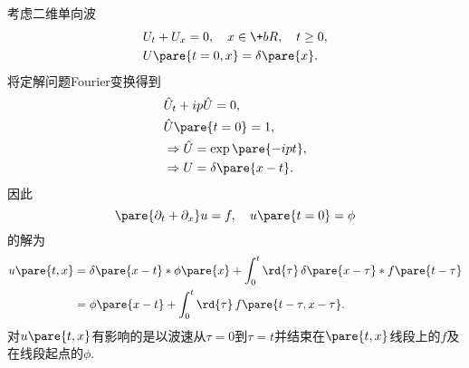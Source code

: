 \documentclass[hidelinks]{ctexart}
\begin{document}
\begin{sample}
    \begin{ex}
        考虑二维单向波
        \begin{align*}
            & U_t + U_x = 0,\quad x\in \+bR,\quad t\ge 0, \\
            & U\pare{t=0,x} = \delta\pare{x}.
        \end{align*}
        将定解问题Fourier变换得到
        \begin{align*}
            & \hat U_t + ip\hat U = 0, \\
            & \hat U\pare{t=0} = 1, \\
            & \Rightarrow \hat U = \exp\pare{-ipt}, \\
            & \Rightarrow U = \delta\pare{x-t}.
        \end{align*}
        因此
        \[ \pare{\partial_t + \partial_x}u = f,\quad u\pare{t=0} = \phi \]
        的解为
        \begin{align*}
            u\pare{t,x} &= \delta\pare{x-t}*\phi\pare{x} + \int_0^t \rd{\tau}\,\delta\pare{x-\tau} * f\pare{t-\tau} \\
            &= \phi\pare{x-t} + \int_0^t \rd{\tau}\, f\pare{t-\tau,x-\tau}.
        \end{align*}
        对$u\pare{t,x}$有影响的是以波速从$\tau = 0$到$\tau = t$并结束在$\pare{t,x}$线段上的$f$及在线段起点的$\phi$.
    \end{ex}
\end{sample}
\end{document}
